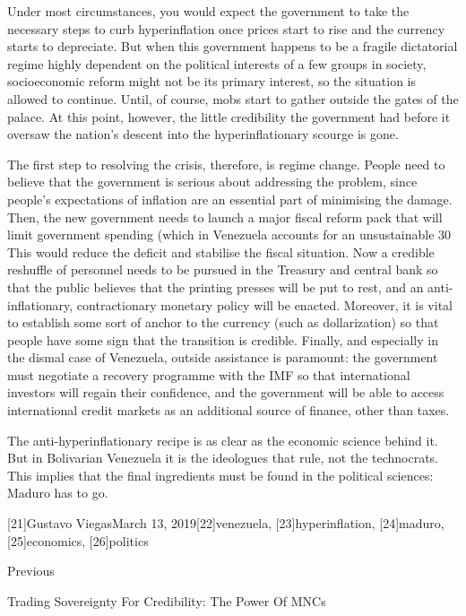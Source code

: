    Under most circumstances, you would expect the government to take the
   necessary steps to curb hyperinflation once prices start to rise and
   the currency starts to depreciate. But when this government happens to
   be a fragile dictatorial regime highly dependent on the political
   interests of a few groups in society, socioeconomic reform might not be
   its primary interest, so the situation is allowed to continue. Until,
   of course, mobs start to gather outside the gates of the palace. At
   this point, however, the little credibility the government had before
   it oversaw the nation's descent into the hyperinflationary scourge is
   gone.

   The first step to resolving the crisis, therefore, is regime change.
   People need to believe that the government is serious about addressing
   the problem, since people's expectations of inflation are an essential
   part of minimising the damage. Then, the new government needs to launch
   a major fiscal reform pack that will limit government spending (which
   in Venezuela accounts for an unsustainable 30%
   This would reduce the deficit and stabilise the fiscal situation. Now a
   credible reshuffle of personnel needs to be pursued in the Treasury and
   central bank so that the public believes that the printing presses will
   be put to rest, and an anti-inflationary, contractionary monetary
   policy will be enacted. Moreover, it is vital to establish some sort of
   anchor to the currency (such as dollarization) so that people have some
   sign that the transition is credible. Finally, and especially in the
   dismal case of Venezuela, outside assistance is paramount: the
   government must negotiate a recovery programme with the IMF so that
   international investors will regain their confidence, and the
   government will be able to access international credit markets as an
   additional source of finance, other than taxes.

   The anti-hyperinflationary recipe is as clear as the economic science
   behind it. But in Bolivarian Venezuela it is the ideologues that rule,
   not the technocrats. This implies that the final ingredients must be
   found in the political sciences: Maduro has to go.

   [21]Gustavo ViegasMarch 13, 2019[22]venezuela, [23]hyperinflation,
   [24]maduro, [25]economics, [26]politics

   Previous

Trading Sovereignty For Credibility: The Power Of MNCs

